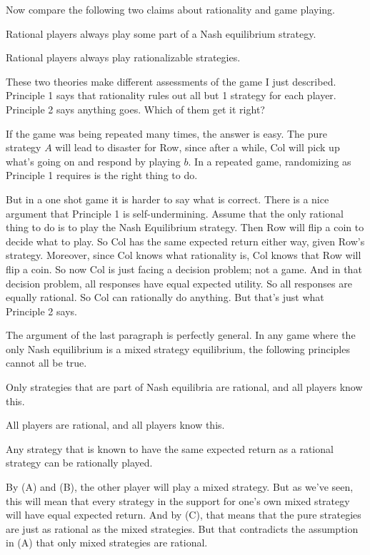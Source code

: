 \documentclass[openany]{book}
\begin{document}
Now compare the following two claims about rationality and game playing.

\begin{enumerate*}
\item Rational players always play some part of a Nash equilibrium strategy.
\item Rational players always play rationalizable strategies.
\end{enumerate*}
These two theories make different assessments of the game I just described. Principle 1 says that rationality rules out all but 1 strategy for each player. Principle 2 says anything goes. Which of them get it right?

If the game was being repeated many times, the answer is easy. The pure strategy $A$ will lead to disaster for Row, since after a while, Col will pick up what's going on and respond by playing $b$. In a repeated game, randomizing as Principle 1 requires is the right thing to do.

But in a one shot game it is harder to say what is correct. There is a nice argument that Principle 1 is self-undermining. Assume that the only rational thing to do is to play the Nash Equilibrium strategy. Then Row will flip a coin to decide what to play. So Col has the same expected return either way, given Row's strategy. Moreover, since Col knows what rationality is, Col knows that Row will flip a coin. So now Col is just facing a decision problem; not a game. And in that decision problem, all responses have equal expected utility. So all responses are equally rational. So Col can rationally do anything. But that's just what Principle 2 says.

The argument of the last paragraph is perfectly general. In any game where the only Nash equilibrium is a mixed strategy equilibrium, the following principles cannot all be true.

\begin{enumerate*}
\renewcommand{\labelenumi}{(\Alph{enumi})}
\item Only strategies that are part of Nash equilibria are rational, and all players know this.
\item All players are rational, and all players know this.
\item Any strategy that is known to have the same expected return as a rational strategy can be rationally played.
\end{enumerate*}
By (A) and (B), the other player will play a mixed strategy. But as we've seen, this will mean that every strategy in the support for one's own mixed strategy will have equal expected return. And by (C), that means that the pure strategies are just as rational as the mixed strategies. But that contradicts the assumption in (A) that only mixed strategies are rational. 
\end{document}
